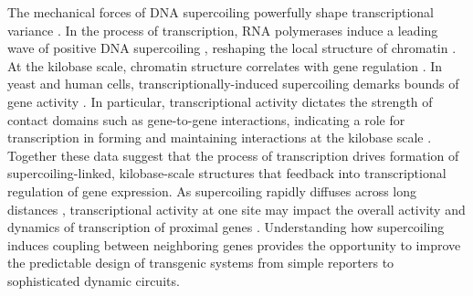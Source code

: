 \documentclass[11pt]{article}
\begin{document}
The mechanical forces of DNA supercoiling powerfully shape transcriptional variance \parencite{desaiDNArepairPathwayCan2021,chongMechanismTranscriptionalBursting2014}.
In the process of transcription, RNA polymerases induce a leading wave of positive DNA supercoiling \parencite{wuTranscriptionGeneratesPositively1988,liuSupercoilingDNATemplate1987}, reshaping the local structure of chromatin \parencite{acharNegativeSupercoilGene2020,tevesTranscriptiongeneratedTorsionalStress2014,naughtonTranscriptionFormsRemodels2013,guoHighresolutionGenomewideMapping2021a}.
At the kilobase scale, chromatin structure correlates with gene regulation \parencite{hsiehResolving3DLandscape2020,rowleyEvolutionarilyConservedPrinciples2017, krietensteinUltrastructuralDetailsMammalian2020}.
In yeast and human cells, transcriptionally-induced supercoiling demarks bounds of gene activity \parencite{acharNegativeSupercoilGene2020,naughtonTranscriptionFormsRemodels2013}.
In particular, transcriptional activity dictates the strength of contact domains such as gene-to-gene interactions, indicating a role for transcription in forming and maintaining interactions at the kilobase scale \parencite{rowleyOrganizationalPrinciples3D2018,rowleyEvolutionarilyConservedPrinciples2017}.
Together these data suggest that the process of transcription drives formation of supercoiling-linked, kilobase-scale structures that feedback into transcriptional regulation of gene expression.
As supercoiling rapidly diffuses across long distances \parencite{loenhoutDynamicsDNASupercoils2012}, transcriptional activity at one site may impact the overall activity and dynamics of transcription of proximal genes \parencite{sevierPropertiesGeneExpression2018, sevierCollectivePolymeraseDynamics2022,tripathiDNASupercoilingmediatedCollective2021}.
Understanding how supercoiling induces coupling between neighboring genes provides the opportunity to improve the predictable design of transgenic systems from simple reporters to sophisticated dynamic circuits.
\end{document}
